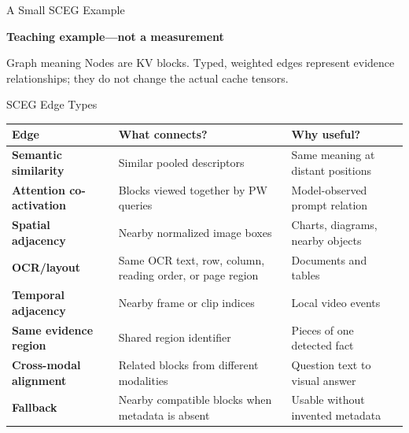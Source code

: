 \documentclass[aspectratio=169,10pt]{beamer}
\newcommand{\teachinglabel}{\textcolor{mkPurple}{\textbf{Teaching example---not a measurement}}}
\begin{document}
\begin{frame}{A Small SCEG Example}
\small
\begin{center}
\end{center}
\teachinglabel
\begin{block}{Graph meaning}
Nodes are KV blocks. Typed, weighted edges represent evidence relationships; they do not change
the actual cache tensors.
\end{block}
\end{frame}

\begin{frame}{SCEG Edge Types}
\scriptsize
\begin{tabularx}{\textwidth}{>{\bfseries}p{}p{}X}
\toprule
Edge & What connects? & Why useful? \\
\midrule
Semantic similarity & Similar pooled descriptors & Same meaning at distant positions \\
Attention co-activation & Blocks viewed together by PW queries & Model-observed prompt relation \\
Spatial adjacency & Nearby normalized image boxes & Charts, diagrams, nearby objects \\
OCR/layout & Same OCR text, row, column, reading order, or page region & Documents and tables \\
Temporal adjacency & Nearby frame or clip indices & Local video events \\
Same evidence region & Shared region identifier & Pieces of one detected fact \\
Cross-modal alignment & Related blocks from different modalities & Question text to visual answer \\
Fallback & Nearby compatible blocks when metadata is absent & Usable without invented metadata \\
\bottomrule
\end{tabularx}
\end{frame}
\end{document}
